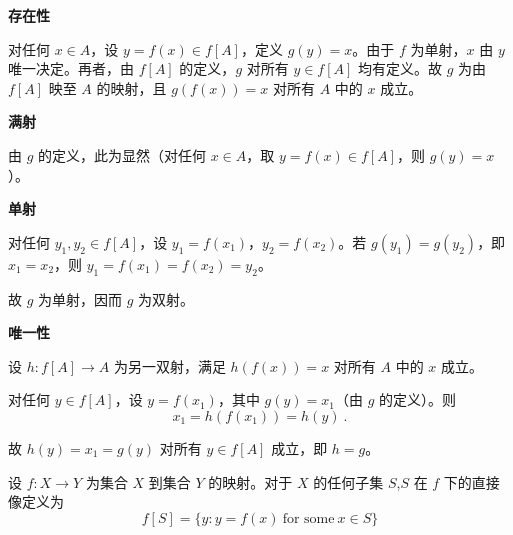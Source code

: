 \begin{questions}
\begin{parts}
\begin{solution}
\textbf{存在性}

对任何 $x\in A$，设 $y=f(x)\in f[A]$，定义 $g(y)=x$。由于 $f$ 为单射，$x$ 由 $y$ 唯一决定。再者，由 $f[A]$ 的定义，$g$ 对所有 $y\in f[A]$ 均有定义。故 $g$ 为由 $f[A]$ 映至 $A$ 的映射，且 $g(f(x))=x$ 对所有 $A$ 中的 $x$ 成立。

\textbf{满射}

由 $g$ 的定义，此为显然（对任何 $x\in A$，取 $y=f(x)\in f[A]$，则 $g(y)=x$）。

\textbf{单射}

对任何 $y_1,y_2\in f[A]$，设 $y_1=f(x_1)$，$y_2=f(x_2)$。若 $g(y_1)=g(y_2)$，即 $x_1=x_2$，则 $y_1=f(x_1)=f(x_2)=y_2$。

故 $g$ 为单射，因而 $g$ 为双射。

\textbf{唯一性}

设 $h:f[A]\to A$ 为另一双射，满足 $h(f(x))=x$ 对所有 $A$ 中的 $x$ 成立。

对任何 $y\in f[A]$，设 $y=f(x_1)$，其中 $g(y)=x_1$（由 $g$ 的定义）。则
\[
x_1=h(f(x_1))=h(y)\ .
\]

故 $h(y)=x_1=g(y)$ 对所有 $y\in f[A]$ 成立，即 $h=g$。
\end{solution}

\end{parts}

\question 设 $f:X\to Y$ 为集合 $X$ 到集合 $Y$ 的映射。对于 $X$ 的任何子集 $S$,$S$ 在 $f$ 下的直接像定义为
\[f[S]=\{y:y=f(x)\ \text{for some}\ x\in S\}\]
\end{questions}
